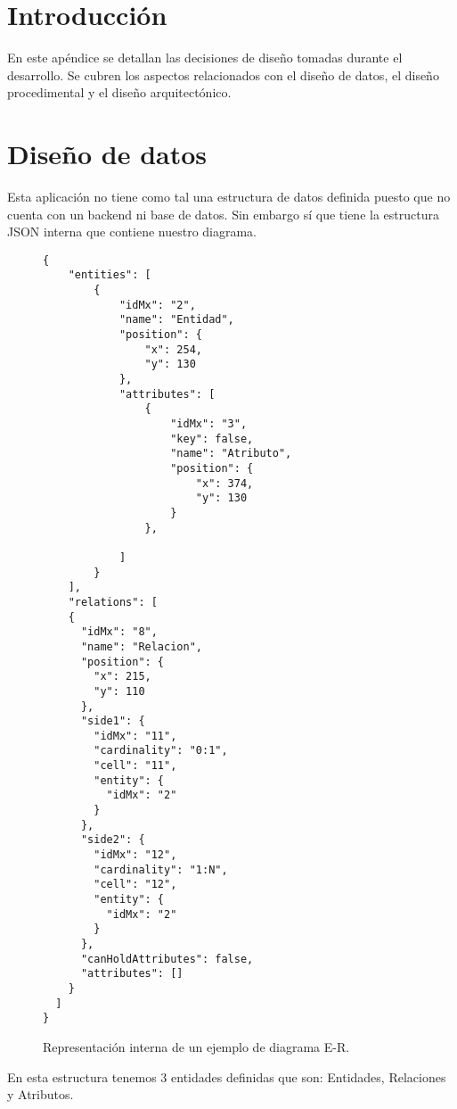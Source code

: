 
\section{Introducción}

En este apéndice se detallan las decisiones de diseño tomadas durante el desarrollo. Se cubren los aspectos relacionados con el diseño de datos, el diseño procedimental y el diseño arquitectónico.

\section{Diseño de datos}
Esta aplicación no tiene como tal una estructura de datos definida puesto que no cuenta con un backend ni base de datos. Sin embargo sí que tiene la estructura JSON interna que contiene nuestro diagrama.

\begin{figure}
\lstset{breaklines=true, basicstyle=\footnotesize}
\begin{lstlisting}[frame=single]
{
    "entities": [
        {
            "idMx": "2",
            "name": "Entidad",
            "position": {
                "x": 254,
                "y": 130
            },
            "attributes": [
                {
                    "idMx": "3",
                    "key": false,
                    "name": "Atributo",
                    "position": {
                        "x": 374,
                        "y": 130
                    }
                },

            ]
        }
    ],
    "relations": [
    {
      "idMx": "8",
      "name": "Relacion",
      "position": {
        "x": 215,
        "y": 110
      },
      "side1": {
        "idMx": "11",
        "cardinality": "0:1",
        "cell": "11",
        "entity": {
          "idMx": "2"
        }
      },
      "side2": {
        "idMx": "12",
        "cardinality": "1:N",
        "cell": "12",
        "entity": {
          "idMx": "2"
        }
      },
      "canHoldAttributes": false,
      "attributes": []
    }
  ]
}
\end{lstlisting}
\caption{Representación interna de un ejemplo de diagrama E-R.}
\label{fig:e-r-structure}
\end{figure}

En esta estructura tenemos 3 entidades definidas que son: Entidades, Relaciones y Atributos.

